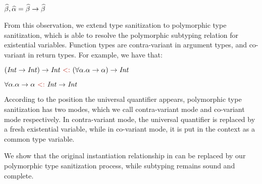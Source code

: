$\widehat{\beta}, \widehat{\alpha} = \widehat{\beta} \to \widehat{\beta}$

From this observation, we extend type sanitization to polymorphic type
sanitization, which is able to resolve the polymorphic subtyping relation for
existential variables. Function types are contra-variant in argument
types, and co-variant in return types. For example, we have that:

$(\Int \to \Int) \to \Int \tsub (\forall \varA. \varA \to \varA) \to \Int $

$\forall \varA. \varA \to \varA \tsub \Int \to \Int$

\noindent According to the position the universal
quantifier appears, polymorphic type sanitization has two modes, which we call
contra-variant mode and co-variant mode respectively.
In contra-variant mode, the universal quantifier is replaced by a fresh
existential variable, while in co-variant mode, it is put in the context as a
common type variable.

We show that the original instantiation relationship in
\citet{dunfield2013complete} can be replaced by our polymorphic type
sanitization process, while subtyping remains sound and complete.

